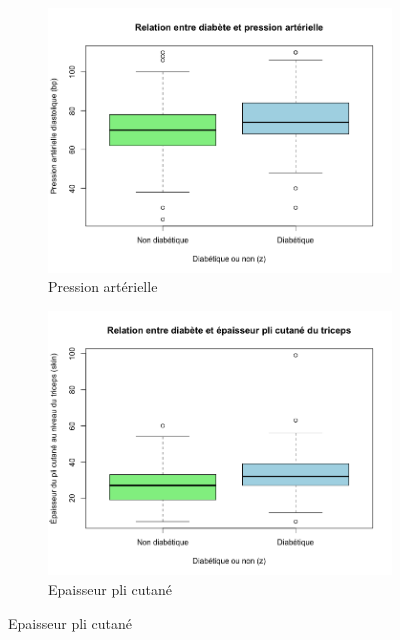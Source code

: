 \documentclass[a4paper,10pt]{report}
\begin{document}
\begin{figure}[H]
\begin{subfigure}[b]{0.25\linewidth}
		\label{fig:1-3-2-boxplot-diabete-glucose}
	\end{subfigure}%
	\begin{subfigure}[b]{0.25\linewidth}
		\centering
		\captionsetup{justification=centering}
		\includegraphics[width=1\linewidth]{img/1-3-2-boxplot-diabete-pression-arterielle}
		\caption{\scriptsize Pression artérielle}
		\label{fig:1-3-2-boxplot-diabete-pression-arterielle}
	\end{subfigure}%
	\begin{subfigure}[b]{0.25\linewidth}
		\centering
		\captionsetup{justification=centering}
		\includegraphics[width=1\linewidth]{img/1-3-2-boxplot-diabete-pli-cutane}
		\caption{\scriptsize Epaisseur pli cutané}

\end{subfigure}
\end{figure}
\end{document}
